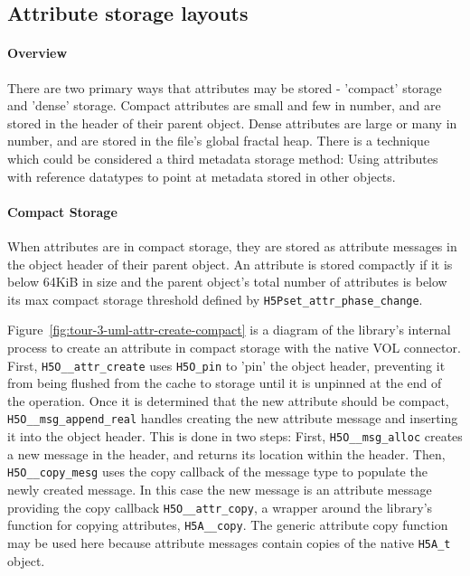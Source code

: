\subsection{Attribute storage layouts} 

\paragraph{Overview} There are two primary ways that attributes may be stored - 'compact' storage and 'dense' storage. Compact attributes are small and few in number, and are stored in the header of their parent object. Dense attributes are large or many in number, and are stored in the file's global fractal heap. There is a technique which could be considered a third metadata storage method: Using attributes with reference datatypes to point at metadata stored in other objects. 

\paragraph{Compact Storage} When attributes are in compact storage, they are stored as attribute messages in the object header of their parent object. An attribute is stored compactly if it is below 64KiB in size and the parent object's total number of attributes is below its max compact storage threshold defined by \texttt{H5Pset\_attr\_phase\_change}.

Figure~\ref{fig:tour-3-uml-attr-create-compact} is a diagram of the library's internal process to create an attribute in compact storage with the native VOL connector. First, \texttt{H5O\_\_attr\_create} uses \texttt{H5O\_pin} to 'pin' the object header, preventing it from being flushed from the cache to storage until it is unpinned at the end of the operation. Once it is determined that the new attribute should be compact, \texttt{H5O\_\_msg\_append\_real} handles creating the new attribute message and inserting it into the object header. This is done in two steps: First, \texttt{H5O\_\_msg\_alloc} creates a new message in the header, and returns its location within the header. Then, \texttt{H5O\_\_copy\_mesg} uses the copy callback of the message type to populate the newly created message. In this case the new message is an attribute message providing the copy callback \texttt{H5O\_\_attr\_copy}, a wrapper around the library's function for copying attributes, \texttt{H5A\_\_copy}. The generic attribute copy function may be used here because attribute messages contain copies of the native \texttt{H5A\_t} object.

